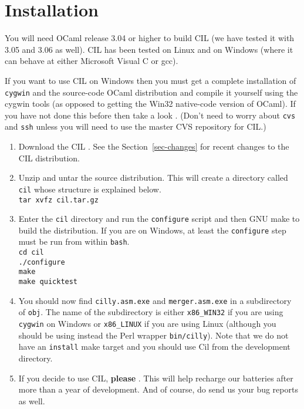 \documentclass{article}
\def\secref#1{Section~\ref{sec-#1}}
\newcommand{\hsp}{\hspace{0.5in}}
\def\t#1{{\tt #1}}
\begin{document}
\section{Installation}

You will need OCaml release 3.04 or higher to build CIL (we have tested it
with 3.05 and 3.06 as well). CIL has been tested on Linux and on Windows
(where it can behave at either Microsoft Visual C or gcc).

 If you want to use CIL on Windows then you must get a complete installation
of \t{cygwin} and the source-code OCaml distribution and compile it yourself
using the cygwin tools (as opposed to getting the Win32 native-code version of
OCaml). If you have not done this before then take a look
. (Don't need to worry about \t{cvs} and
\t{ssh} unless you will need to use the master CVS repository for CIL.)

\begin{enumerate}
\item Download the CIL . See the
\secref{changes} for recent changes to the CIL distribution.
\item Unzip and untar the source distribution. This will create a directory
      called \t{cil} whose structure is explained below. \\
      \hsp\verb!tar xvfz cil.tar.gz!
\item Enter the \t{cil} directory and run the \t{configure} script and then 
      GNU make to build the distribution. If you are on Windows, at least the
      \t{configure} step must be run from within \t{bash}. \\
      \hsp\verb!cd cil!\\
      \hsp\verb!./configure!\\
      \hsp\verb!make!\\
      \hsp\verb!make quicktest!\\

\item You should now find \t{cilly.asm.exe} and \t{merger.asm.exe} in a
subdirectory of \t{obj}. The name of the subdirectory is either \t{x86\_WIN32}
if you are using \t{cygwin} on Windows or \t{x86\_LINUX} if you are using
Linux (although you should be using instead the Perl wrapper \t{bin/cilly}).
Note that we do not have an \t{install} make target and you should use Cil
from the development directory. 
\item If you decide to use CIL, {\bf please}
. This will help recharge
our batteries after more than a year of development. And of course, do send us
your bug reports as well.

\end{enumerate}
\end{document}
